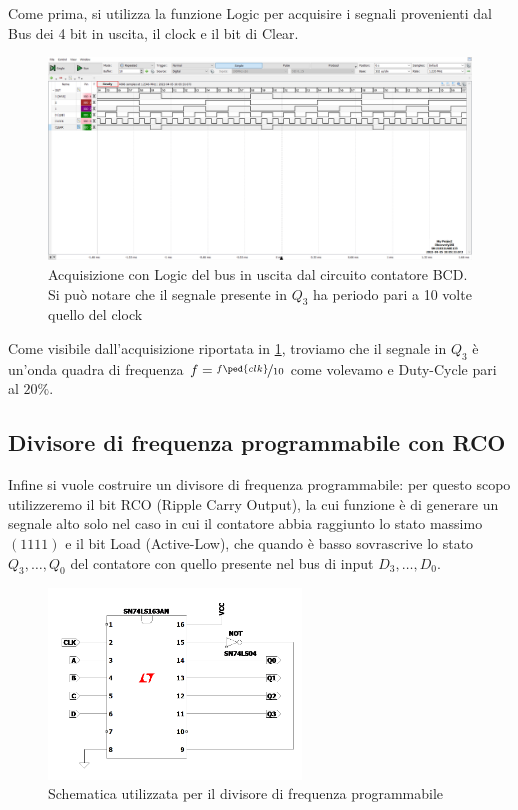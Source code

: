 \documentclass[10pt, a4paper, italian]{article}
\begin{document}
Come prima, si utilizza la funzione Logic per acquisire i segnali provenienti
dal Bus dei 4 bit in uscita, il clock e il bit di Clear.
\begin{figure}[htbp]
\centering
	\includegraphics[width=\textwidth]{5.e}
	\caption{Acquisizione con Logic del bus in uscita dal circuito contatore BCD.
	Si può notare che il segnale presente in $Q_3$ ha periodo pari a 10 volte
	quello del clock \label{fig: Count_10th}}
\end{figure}

Come visibile dall'acquisizione riportata in \cref{fig: Count_10th}, troviamo
che il segnale in $Q_3$ è un'onda quadra di frequenza
$f = \nicefrac{f\ped{clk}}{10}$ come volevamo e Duty-Cycle pari al
$20 \percent$.

\subsection{Divisore di frequenza programmabile con RCO}
Infine si vuole costruire un divisore di frequenza programmabile:
per questo scopo utilizzeremo il bit RCO (Ripple Carry Output), la cui
funzione è di generare un segnale alto solo nel caso in cui il contatore abbia
raggiunto lo stato massimo $(1111)$ e il bit Load (Active-Low), che quando
è basso sovrascrive lo stato $Q_3, \ldots, Q_0$ del contatore con quello
presente nel bus di input $D_3, \ldots, D_0$. 
\begin{figure}[htbp]
\centering
	\includegraphics[width=0.6\textwidth]{Draft2}
	\caption{Schematica utilizzata per il divisore di frequenza programmabile
	\label{schem: programmable_counter}}
\end{figure}
\end{document}
